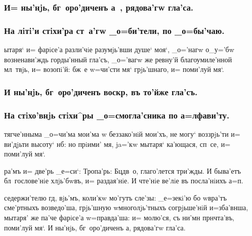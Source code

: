 \documentclass[12pt,a5paper,dvips,civil=antiqua]{hipbook}
\begin{document}
\subsubsection{И= ны'нjь, бг~оро'диченъ а~, рядова'гw гла'са.}

\subsubsection{На лiтi'и стiхи'ра ст~а'гw _о=би'тели, по _о=бы'чаю.}

 ытаря` и= фарiсе'а разли'чiе разумjь'вши
душе` моя`, _о='нагw о_у='бw возненави'ждь горды'нный гла'съ, _о='вагw
же ревну'й благоумиле'нной мл~твjь, и= возопi'й: бж~е w=чи'сти мя`
грjь'шнаго, и= поми'луй мя`.

\subsubsection{И ны'нjь, бг~оро'диченъ воскр, въ то'йже гла'съ.}

\subsubsection{На стiхо'внjь стiхи^ры _о=смогла'сника по а=лфави'ту.}

 тягче'нныма _о=чи'ма мои'ма w\т
беззако'нiй мои'хъ, не могу` воззрjь'ти и= ви'дjьти высоту` нб:
но прiими' мя, ja='кw мытаря` ка'ющася, сп~се, и= поми'луй мя`.

 ра'мъ и= две'рь
_е=си`: Тропа'рь: Бц дв~о, глаго'лется три'жды. И быва'етъ
бл~гослове'нiе хлjь'бwвъ, и= раздая'нiе. И чте'нiе ве'лiе въ
посла'нiихъ а=п.


 седержи'телю гд, вjь'мъ, коли'кw
мо'гутъ сле'зы: _е=зекi'ю бо w\т вра'тъ сме'ртныхъ возведо'ша,
грjь'шную w\т многолjь'тныхъ согрjьше'нiй и=зба'внша, мытаря' же па'че
фарiсе'а w=правда'ша: и= молю'ся, съ ни'мн прнчта'въ, поми'луй мя`. И
ны'нjь, бг~оро'диченъ а, рядова'гw гла'са.
\end{document}

